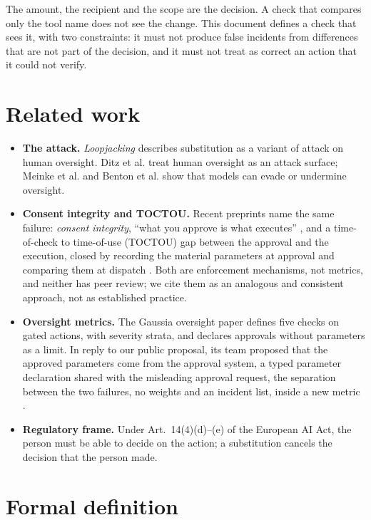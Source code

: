 \documentclass[11pt,a4paper]{article}
\begin{document}
The amount, the recipient and the scope are the decision. A check that compares only the tool name does not see
the change. This document defines a check that sees it, with two constraints: it must not produce false
incidents from differences that are not part of the decision, and it must not treat as correct an action that it
could not verify.

\section{Related work}

\begin{itemize}
  \item \textbf{The attack.} \emph{Loopjacking} \cite{loopjacking} describes substitution as a variant of attack
    on human oversight. Ditz et al. \cite{ditz2025} treat human oversight as an attack surface; Meinke et al.
    \cite{meinke2024} and Benton et al. \cite{benton2024} show that models can evade or undermine oversight.
  \item \textbf{Consent integrity and TOCTOU.} Recent preprints name the same failure: \emph{consent integrity},
    ``what you approve is what executes'' \cite{consentintegrity}, and a time-of-check to time-of-use (TOCTOU)
    gap between the approval and the execution, closed by recording the material parameters at approval and
    comparing them at dispatch \cite{toctou}. Both are enforcement mechanisms, not metrics, and neither has peer
    review; we cite them as an analogous and consistent approach, not as established practice.
  \item \textbf{Oversight metrics.} The Gaussia oversight paper \cite{gaussia2026} defines five checks on gated
    actions, with severity strata, and declares approvals without parameters as a limit. In reply to our public
    proposal, its team proposed that the approved parameters come from the approval system, a typed parameter
    declaration shared with the misleading approval request, the separation between the two failures, no weights
    and an incident list, inside a new metric \cite{gaussiadisc}.
  \item \textbf{Regulatory frame.} Under Art.~14(4)(d)--(e) of the European AI Act, the person must be able to
    decide on the action; a substitution cancels the decision that the person made.
\end{itemize}

\section{Formal definition}
\end{document}
